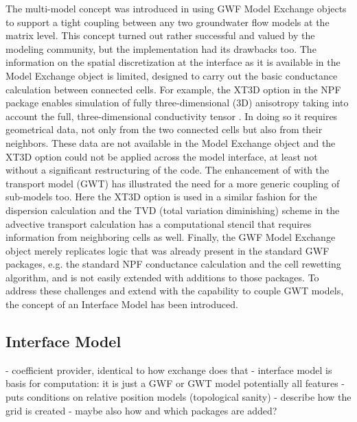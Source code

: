 The multi-model concept was introduced in \mf using GWF Model Exchange objects to support a tight coupling between any two groundwater flow models at the matrix level. This concept turned out rather successful and valued by the modeling community, but the implementation had its drawbacks too. The information on the spatial discretization at the interface as it is available in the Model Exchange object is limited, designed to carry out the basic conductance calculation between connected cells. For example, the XT3D option in the NPF package enables simulation of fully three-dimensional (3D) anisotropy taking into account the full, three-dimensional conductivity tensor \cite{modflow6xt3d}. In doing so it requires geometrical data, not only from the two connected cells but also from their neighbors. These data are not available in the Model Exchange object and the XT3D option could not be applied across the model interface, at least not without a significant restructuring of the code. The enhancement of \mf with the transport model (GWT) \cite{???} has illustrated the need for a more generic coupling of sub-models too. Here the XT3D option is used in a similar fashion for the dispersion calculation and the TVD (total variation diminishing) scheme in the advective transport calculation has a computational stencil that requires information from neighboring cells as well. Finally, the GWF Model Exchange object merely replicates logic that was already present in the standard GWF packages, e.g. the standard NPF conductance calculation and the cell rewetting algorithm, and is not easily extended with additions to those packages. To address these challenges and extend \mf with the capability to couple GWT models, the concept of an Interface Model has been introduced.

\subsection{Interface Model}

- coefficient provider, identical to how exchange does that
- interface model is basis for computation: it is just a GWF or GWT model potentially all features
- puts conditions on relative position models (topological sanity)
- describe how the grid is created
- maybe also how and which packages are added?

